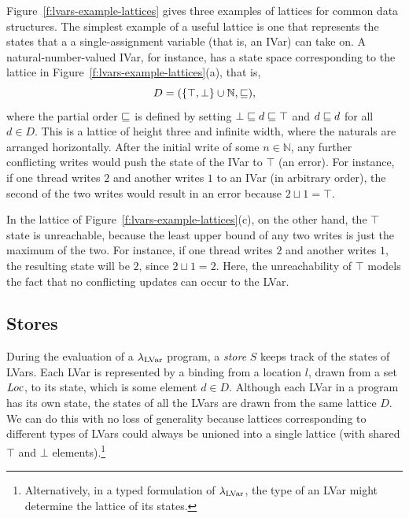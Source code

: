 Figure~\ref{f:lvars-example-lattices} gives three examples of lattices
for common data structures.  The simplest example of a useful
lattice is one that represents the states that a a single-assignment
variable (that is, an IVar) can take on.  A natural-number-valued
IVar, for instance, has a state space corresponding to the lattice in
Figure~\ref{f:lvars-example-lattices}(a), that is,
\begin{displaymath}
  D = (\lbrace \top, \bot \rbrace \cup \mathbb{N}, \sqsubseteq), 
\end{displaymath}
where the partial order $\sqsubseteq$ is defined by setting $\bot \sqsubseteq d
\sqsubseteq \top$ and $d \sqsubseteq d$ for all $d \in D$.  This is a lattice of
height three and infinite width, where the naturals are arranged
horizontally.  After the initial write of some $n \in \mathbb{N}$, any
further conflicting writes would push the state of the IVar to $\top$
(an error).  For instance, if one thread writes $2$ and another writes
$1$ to an IVar (in arbitrary order), the second of the two writes
would result in an error because $2 \sqcup 1 = \top$.

In the lattice of Figure~\ref{f:lvars-example-lattices}(c), on the
other hand, the $\top$ state is unreachable, because the least upper
bound of any two writes is just the maximum of the two.  For instance,
if one thread writes $2$ and another writes $1$, the resulting state
will be $2$, since $2 \sqcup 1 = 2$.  Here, the unreachability of
$\top$ models the fact that no conflicting updates can occur to the
LVar.

\subsection{Stores}\label{subsection:stores}

During the evaluation of a $\lambda_{\textrm{LVar}}$ program, a \emph{store} $S$
keeps track of the states of LVars.  Each LVar is represented by a
binding from a location $l$, drawn from a set $\mathit{Loc}$, to its state,
which is some element $d \in D$.  Although each LVar in a program has
its own state, the states of all the LVars are drawn from the same
lattice $D$.  We can do this with no loss of generality because
lattices corresponding to different types of LVars could always be
unioned into a single lattice (with shared $\top$ and $\bot$
elements).\footnote{Alternatively, in a typed formulation of
$\lambda_{\textrm{LVar}}$, the type of an LVar might determine the lattice of its
states.}

